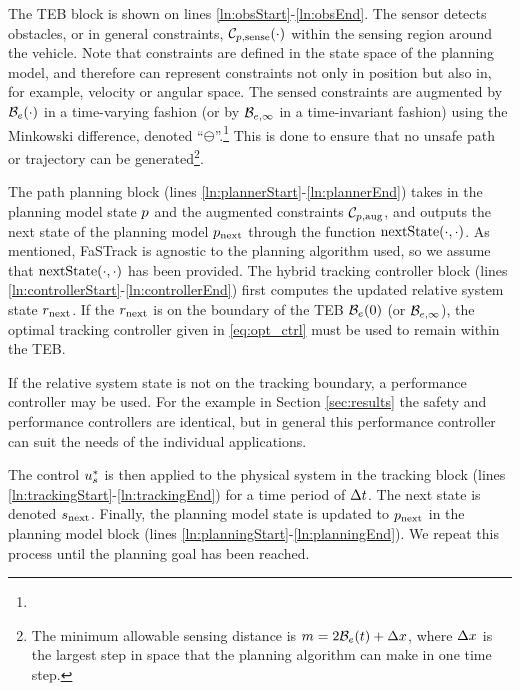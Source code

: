 The TEB block is shown on lines \ref{ln:obsStart}-\ref{ln:obsEnd}. 
The sensor detects obstacles, or in general constraints, $\mathcal C_{p,\text{sense}}(\cdot)$ within the sensing region around the vehicle.
Note that constraints are defined in the state space of the planning model, and therefore can represent constraints not only in position but also in, for example, velocity or angular space.
The sensed constraints are augmented by $\mathcal B_e(\cdot)$ in a time-varying fashion (or by $\mathcal B_{e, \infty}$ in a time-invariant fashion) using the Minkowski difference, denoted ``$\ominus$''.\footnote{} 
This is done to ensure that no unsafe path or trajectory can be generated\footnote{The minimum allowable sensing distance is $m = 2\mathcal B_e(t) + \Delta x$, where $\Delta x$ is the largest step in space that the planning algorithm can make in one time step.}.

The path planning block (lines \ref{ln:plannerStart}-\ref{ln:plannerEnd}) takes in the planning model state $p$ and the augmented constraints $\mathcal C_{p,\text{aug}}$, and outputs the next state of the planning model $p_\text{next}$ through the function $\text{nextState}(\cdot, \cdot)$.
As mentioned, FaSTrack is agnostic to the planning algorithm used, so we assume that $\text{nextState}(\cdot, \cdot)$ has been provided.
The hybrid tracking controller block (lines \ref{ln:controllerStart}-\ref{ln:controllerEnd}) first computes the updated relative system state $r_\text{next}$. 
If the $r_\text{next}$ is on the boundary of the TEB $\mathcal B_e(0)$ (or $\mathcal B_{e, \infty}$), the optimal tracking controller given in \eqref{eq:opt_ctrl} must be used to remain within the TEB. 

If the relative system state is not on the tracking boundary, a performance controller may be used. For the example in Section \ref{sec:results} the safety and performance controllers are identical, but in general this performance controller can suit the needs of the individual applications.

The control $u_s^*$ is then applied to the physical system in the tracking block (lines \ref{ln:trackingStart}-\ref{ln:trackingEnd}) for a time period of $\Delta t$. 
The next state is denoted $s_\text{next}$. 
Finally, the planning model state is updated to $p_\text{next}$ in the planning model block (lines \ref{ln:planningStart}-\ref{ln:planningEnd}). 
We repeat this process until the planning goal has been reached.